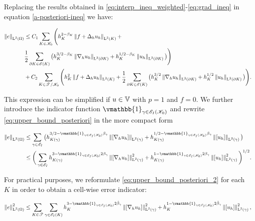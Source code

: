 \documentclass[a4paper,11pt]{article}
\begin{document}
{Replacing the results obtained in \eqref{eq:interp_ineq_weighted}-\eqref{eq:grad_ineq} in equation \eqref{a-posteriori-ineq} we have:

\begin{equation}
\begin{split}
\left\|e\right\|_{\operatorname L^{2}(\Omega)} &\leq C_{1}\sum_{K\in \mathscr K_{0}} \Bigg( h_{K}^{2-\beta_{K}} \left\|f + \Delta_{h} u_{h}\right\|_{\operatorname L^{2}(K)} + \\
& \frac{1}{2} \sum_{\partial K \in \mathscr E(K)}  \big(h_{K}^{3/2 - \beta_{K}} \left\|\nabla_{h} u_{h}\right\|_{\operatorname L^{2}(\partial K)} + h_{K}^{1/2 - \beta_{K}} \left\|u_{h}\right\|_{\operatorname L^{2}(\partial K)} \big) \Bigg) \\
& + C_{2} \sum_{K \in \mathscr T^{} \slash \mathscr K_{0}} \Bigg( h_{K}^{2}\left\|f + \Delta_{h} u_{h}\right\|_{\operatorname L^{2}(K)} + \frac{1}{2} \sum_{\partial K \in \mathscr E(K)} \big(h_{K}^{3/2}\left\|\nabla_{h} u_{h}\right\|_{\operatorname L^{2}(\partial K)} +   h_{K}^{1/2}\left\|u_{h}\right\|_{\operatorname L^{2}(\partial K)} \big) \Bigg). 
\end{split}
\label{eq:upper_bound_posteriori}
\end{equation}

This expression can be simplified if $u \in \mathbb V$ with $p = 1$ and $f = 0$. We further introduce the indicator function $\vmathbb{1}_{\gamma \in \cE_{I}(\cK_{0})}$ and rewrite \eqref{eq:upper_bound_posteriori} in the more compact form

 \begin{equation}
        \begin{split}
    \Norm{e}_{\leb{2}(\Omega)} &\leq  \sum_{\gamma \in \cE_{I}}  \big(h_{K(\gamma)}^{3/2 -  \vmathbb{1}_{\gamma \in \cE_{I}(\cK_{0})}\beta_{\gamma}} \Norm{\jump{\nabla_{h} u_{h}}}_{\leb{2}(\gamma)} + h_{K(\gamma)}^{1/2 - \vmathbb{1}_{\gamma \in \cE_{I}(\cK_{0})}\beta_{\gamma}} \Norm{\jump{u_{h}}}_{\leb{2}(\gamma)}\big)\\
    & \leq \bigg( \sum_{\gamma \in \cE_{I}}  h_{K(\gamma)}^{3 - \vmathbb{1}_{\gamma \in \cE_{I}(\cK_{0})}2\beta_{\gamma}} \Norm{\jump{\nabla_{h} u_{h}}}^2_{\leb{2}(\gamma)} + h_{K(\gamma)}^{1 - \vmathbb{1}_{\gamma \in \cE_{I}(\cK_{0})}2\beta_{\gamma}}\Norm{\jump{u_{h}}}^2_{\leb{2}(\gamma)}\bigg)^{1/2}.
    \end{split}
    \label{eq:upper_bound_posteriori_2}
\end{equation}

For practical purposes, we reformulate \eqref{eq:upper_bound_posteriori_2} for each $K$ in order to obtain a cell-wise error indicator:

 \begin{equation}
      \Norm{e}_{\leb{2}(\W)}^{2} \leq \sum_{K \in \T{}} \sum_{\gamma \in \cE_{I}(K)}  h_{K}^{3 - \vmathbb{1}_{\gamma \in \cE_{I}(\cK_{0})}2\hat{\beta}_{\gamma}} \Norm{\jump{\nabla_{h} u_{h}}}^2_{\leb{2}(\gamma)} + h_{K}^{1 - \vmathbb{1}_{\gamma \in \cE_{I}(\cK_{0})}2\hat{\beta}_{\gamma}}\Norm{\jump{u_{h}}}^2_{\leb{2}(\gamma)},
    \label{eq:upper_bound_posteriori_cell}
\end{equation}

}
\end{document}
